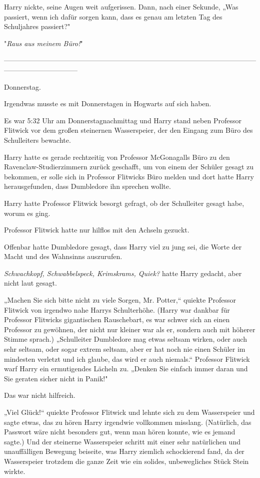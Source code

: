 {Harry nickte, seine Augen weit aufgerissen. Dann, nach einer Sekunde, „Was passiert, wenn ich dafür sorgen kann, dass es genau am letzten Tag des Schuljahres passiert?"

"\emph{Raus aus meinem Büro!}"

--------------------------------------------------------------------------------------------------------------------------------------------

\hfill\break Donnerstag.

Irgendwas musste es mit Donnerstagen in Hogwarts auf sich haben.

Es war 5:32 Uhr am Donnerstagnachmittag und Harry stand neben Professor Flitwick vor dem großen steinernen Wasserspeier, der den Eingang zum Büro des Schulleiters bewachte.

Harry hatte es gerade rechtzeitig von Professor McGonagalls Büro zu den Ravenclaw-Studierzimmern zurück geschafft, um von einem der Schüler gesagt zu bekommen, er solle sich in Professor Flitwicks Büro melden und dort hatte Harry herausgefunden, dass Dumbledore ihn sprechen wollte.

Harry hatte Professor Flitwick besorgt gefragt, ob der Schulleiter gesagt habe, worum es ging.

Professor Flitwick hatte nur hilflos mit den Achseln gezuckt.

Offenbar hatte Dumbledore gesagt, dass Harry viel zu jung sei, die Worte der Macht und des Wahnsinns auszurufen.

\emph{Schwachkopf, Schwabbelspeck, Krimskrams, Quiek?} hatte Harry gedacht, aber nicht laut gesagt.

„Machen Sie sich bitte nicht zu viele Sorgen, Mr. Potter,“ quiekte Professor Flitwick von irgendwo nahe Harrys Schulterhöhe. (Harry war dankbar für Professor Flitwicks gigantischen Rauschebart, es war schwer sich an einen Professor zu gewöhnen, der nicht nur kleiner war als er, sondern auch mit höherer Stimme sprach.) „Schulleiter Dumbledore mag etwas seltsam wirken, oder auch sehr seltsam, oder sogar extrem seltsam, aber er hat noch nie einen Schüler im mindesten verletzt und ich glaube, das wird er auch niemals.“ Professor Flitwick warf Harry ein ermutigendes Lächeln zu. „Denken Sie einfach immer daran und Sie geraten sicher nicht in Panik!"

Das war nicht hilfreich.

„Viel Glück!“ quiekte Professor Flitwick und lehnte sich zu dem Wasserspeier und sagte etwas, das zu hören Harry irgendwie vollkommen misslang. (Natürlich, das Passwort wäre nicht besonders gut, wenn man hören konnte, wie es jemand sagte.) Und der steinerne Wasserspeier schritt mit einer sehr natürlichen und unauffälligen Bewegung beiseite, was Harry ziemlich schockierend fand, da der Wasserspeier trotzdem die ganze Zeit wie ein solides, unbewegliches Stück Stein wirkte.

}
